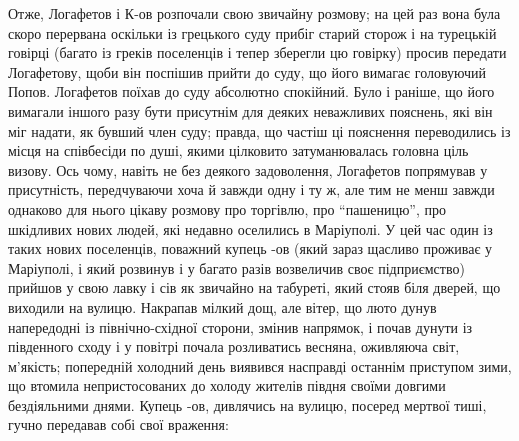 \documentclass[a4paper,20pt]{report}
\begin{document}
Отже, Логафетов і К-ов розпочали свою звичайну розмову; на цей раз вона була скоро
перервана оскільки із грецького суду прибіг старий сторож і на турецькій говірці 
(багато із греків поселенців і тепер зберегли цю говірку) просив передати Логафетову, щоби він поспішив
прийти до суду, що його вимагає головуючий Попов.
Логафетов поїхав до суду абсолютно спокійний. Було і раніше, що його вимагали іншого разу
бути присутнім для деяких неважливих пояснень, які він міг надати, як бувший член суду; правда, що частіш
ці пояснення переводились із місця на співбесіди по душі, якими цілковито затуманювалась головна ціль визову. Ось чому,
навіть не без деякого задоволення, Логафетов попрямував у присутність, передчуваючи хоча й завжди одну і ту ж, але тим не менш
завжди однаково для нього цікаву розмову про торгівлю, про ``пашеницю'', про шкідливих нових людей, які недавно
оселились в Маріуполі.
У цей час один із таких нових поселенців, поважний купець -ов (який зараз щасливо проживає у Маріуполі,
і який розвинув і у багато разів возвеличив своє підприємство) прийшов у свою
лавку і сів як звичайно на табуреті, який стояв біля дверей, що виходили на
вулицю.
Накрапав мілкий дощ, але вітер, що люто дунув напередодні із північно-східної сторони, змінив напрямок, і почав
дунути із південного сходу і у повітрі почала розливатись весняна, оживляюча світ, м'якість; попередній холодний день
виявився насправді останнім приступом зими, що втомила непристосованих до холоду жителів півдня своїми довгими
бездіяльними днями.
Купець -ов, дивлячись на вулицю, посеред мертвої тиші, гучно передавав собі свої
враження:
\end{document}
